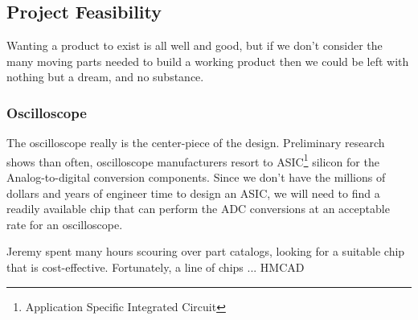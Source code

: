 \subsection{Project Feasibility}
	Wanting a product to exist is all well and good, but if we don't consider the many moving parts needed to build a working product then we could be left with nothing but a dream, and no substance.
	
	\subsubsection{Oscilloscope}
	The oscilloscope really is the center-piece of the design. Preliminary research shows than often, oscilloscope manufacturers resort to ASIC\footnote{Application Specific Integrated Circuit} silicon for the Analog-to-digital conversion components. Since we don't have the millions of dollars and years of engineer time to design an ASIC, we will need to find a readily available chip that can perform the ADC conversions at an acceptable rate for an oscilloscope.
	
	Jeremy spent many hours scouring over part catalogs, looking for a suitable chip that is cost-effective. Fortunately, a line of chips ... HMCAD
